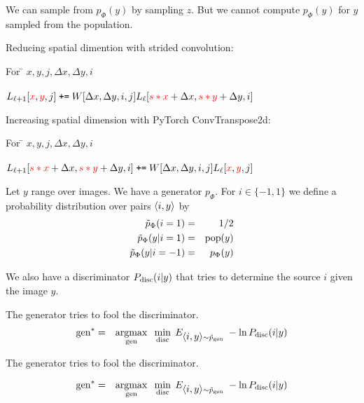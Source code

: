 {\bigskip
We can sample from $p_\Phi(y)$ by sampling $z$.  But we cannot compute $p_\Phi(y)$ for $y$ sampled from the population.

 
Reducing spatial dimention with strided convolution:
\begin{tabbing}
For \= $x,y,j,\Delta x,\Delta y, i$ \\
\\
\>$L_{{\ell+1}}[{\color{red}x},{\color{red}y},j]\; \mbox{\tt +=} \;W[\Delta x, \Delta y, i, j] L_{{\ell}}[{\color{red} s*x} + \Delta x, {\color{red} s*y} + \Delta y, i]$
\end{tabbing}

\vfill
Increasing spatial dimension with PyTorch ConvTranspose2d:
\begin{tabbing}
For \= $x,y,j,\Delta x,\Delta y, i$ \\
\\
\>$L_{{\ell+1}}[{\color{red} s*x} + \Delta x, {\color{red} s*y} + \Delta y, i]\; \mbox{\tt +=} \;W[\Delta x, \Delta y, i, j]L_\ell[{\color{red}x},{\color{red}y},j]$
\end{tabbing}


Let $y$ range over images.  We have a generator $p_\Phi$. For $i \in \{-1,1\}$ we define a probability distribution over pairs
${\mbox{$\langle i,y\rangle$}}$ by
\begin{eqnarray*}
\tilde{p}_\Phi(i = 1) & = & 1/2 \\
\tilde{p}_\Phi(y|i=1) & =&  \mathrm{pop}(y) \\
\tilde{p}_\Phi(y|i=-1) & = & p_\Phi(y)
\end{eqnarray*}

\vfill
We also have a discriminator $P_{\mathrm{disc}}(i|y)$ that tries to determine the source $i$ given the image $y$.

\vfill
The generator tries to fool the discriminator.
\begin{eqnarray*}
\mathrm{gen}^* & = & \operatorname*{argmax}_{\mathrm{gen}}\;\;\min_{\mathrm{disc}}\;E_{{\mbox{$\langle i,y\rangle$}} \sim \tilde{p}_{\mathrm{gen}}}\;-\ln P_{\mathrm{disc}}(i|y)
\end{eqnarray*}


The generator tries to fool the discriminator.

\vfill
\begin{eqnarray*}
\mathrm{gen}^* & = & \operatorname*{argmax}_{\mathrm{gen}}\;\;\min_{\mathrm{disc}}\;E_{{\mbox{$\langle i,y\rangle$}} \sim \tilde{p}_{\mathrm{gen}}}\;-\ln P_{\mathrm{disc}}(i|y)
\end{eqnarray*}

}
